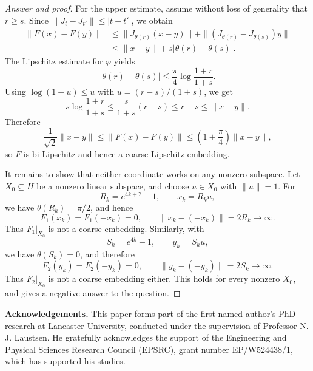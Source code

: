 \documentclass[11pt,reqno]{amsart}
\theoremstyle{plain}
\theoremstyle{definition}
\begin{document}
\begin{proof}[Answer and proof]
For the upper estimate, assume without loss of generality that $r\geq s$. Since $\|J_t-J_{t'}\|\leq|t-t'|$, we obtain
\begin{equation*}
\begin{aligned}
 \|F(x)-F(y)\|
 &\leq\|J_{\theta(r)}(x-y)\|
   +\|(J_{\theta(r)}-J_{\theta(s)})y\|\\
 &\leq\|x-y\|+s|\theta(r)-\theta(s)|.
\end{aligned}
\end{equation*}
The Lipschitz estimate for $\varphi$ yields
\begin{equation*}
 |\theta(r)-\theta(s)|
 \leq\frac\pi4\log\frac{1+r}{1+s}.
\end{equation*}
Using $\log(1+u)\leq u$ with $u=(r-s)/(1+s)$, we get
\begin{equation*}
 s\log\frac{1+r}{1+s}
 \leq\frac{s}{1+s}(r-s)
 \leq r-s
 \leq\|x-y\|.
\end{equation*}
Therefore
\begin{equation*}
 \frac1{\sqrt2}\|x-y\|
 \leq\|F(x)-F(y)\|
 \leq\left(1+\frac\pi4\right)\|x-y\|,
\end{equation*}
so $F$ is bi-Lipschitz and hence a coarse Lipschitz embedding.

It remains to show that neither coordinate works on any nonzero subspace. Let $X_0\subseteq H$ be a nonzero linear subspace, and choose $u\in X_0$ with $\|u\|=1$. For
\begin{equation*}
 R_k=e^{4k+2}-1,
 \qquad x_k=R_ku,
\end{equation*}
we have $\theta(R_k)=\pi/2$, and hence
\begin{equation*}
 F_1(x_k)=F_1(-x_k)=0,
 \qquad \|x_k-(-x_k)\|=2R_k\longrightarrow\infty.
\end{equation*}
Thus $F_1|_{X_0}$ is not a coarse embedding. Similarly, with
\begin{equation*}
 S_k=e^{4k}-1,
 \qquad y_k=S_ku,
\end{equation*}
we have $\theta(S_k)=0$, and therefore
\begin{equation*}
 F_2(y_k)=F_2(-y_k)=0,
 \qquad \|y_k-(-y_k)\|=2S_k\longrightarrow\infty.
\end{equation*}
Thus $F_2|_{X_0}$ is not a coarse embedding either. This holds for every nonzero $X_0$, and gives a negative answer to the question.
\end{proof}

\newpage


\newpage

\noindent\textbf{Acknowledgements.}
This paper forms part of the first-named author's PhD research at Lancaster University, conducted under the supervision of Professor N. J. Laustsen. He gratefully acknowledges the support of the Engineering and Physical Sciences Research Council (EPSRC), grant number EP/W524438/1, which has supported his studies.
\end{document}
